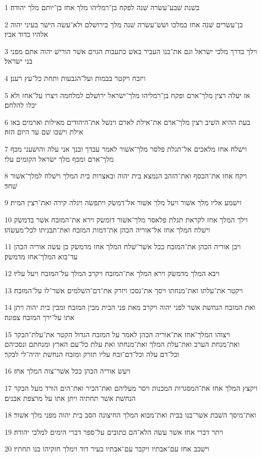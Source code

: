 \par 1 בשׁנת שׁבע־עשׂרה שׁנה לפקח בן־רמליהו מלך אחז בן־יותם מלך יהודה׃
\par 2 בן־עשׂרים שׁנה אחז במלכו ושׁשׁ־עשׂרה שׁנה מלך בירושׁלם ולא־עשׂה הישׁר בעיני יהוה אלהיו כדוד אביו׃
\par 3 וילך בדרך מלכי ישׂראל וגם את־בנו העביר באשׁ כתעבות הגוים אשׁר הורישׁ יהוה אתם מפני בני ישׂראל׃
\par 4 ויזבח ויקטר בבמות ועל־הגבעות ותחת כל־עץ רענן׃
\par 5 אז יעלה רצין מלך־ארם ופקח בן־רמליהו מלך־ישׂראל ירושׁלם למלחמה ויצרו על־אחז ולא יכלו להלחם׃
\par 6 בעת ההיא השׁיב רצין מלך־ארם את־אילת לארם וינשׁל את־היהודים מאילות וארמים באו אילת וישׁבו שׁם עד היום הזה׃
\par 7 וישׁלח אחז מלאכים אל־תגלת פלסר מלך־אשׁור לאמר עבדך ובנך אני עלה והושׁעני מכף מלך־ארם ומכף מלך ישׂראל הקומים עלי׃
\par 8 ויקח אחז את־הכסף ואת־הזהב הנמצא בית יהוה ובאצרות בית המלך וישׁלח למלך־אשׁור שׁחד׃
\par 9 וישׁמע אליו מלך אשׁור ויעל מלך אשׁור אל־דמשׂק ויתפשׂה ויגלה קירה ואת־רצין המית׃
\par 10 וילך המלך אחז לקראת תגלת פלאסר מלך־אשׁור דומשׂק וירא את־המזבח אשׁר בדמשׂק וישׁלח המלך אחז אל־אוריה הכהן את־דמות המזבח ואת־תבניתו לכל־מעשׂהו׃
\par 11 ויבן אוריה הכהן את־המזבח ככל אשׁר־שׁלח המלך אחז מדמשׂק כן עשׂה אוריה הכהן עד־בוא המלך־אחז מדמשׂק׃
\par 12 ויבא המלך מדמשׂק וירא המלך את־המזבח ויקרב המלך על־המזבח ויעל עליו׃
\par 13 ויקטר את־עלתו ואת־מנחתו ויסך את־נסכו ויזרק את־דם־השׁלמים אשׁר־לו על־המזבח׃
\par 14 ואת המזבח הנחשׁת אשׁר לפני יהוה ויקרב מאת פני הבית מבין המזבח ומבין בית יהוה ויתן אתו על־ירך המזבח צפונה׃
\par 15 ויצוהו המלך־אחז את־אוריה הכהן לאמר על המזבח הגדול הקטר את־עלת־הבקר ואת־מנחת הערב ואת־עלת המלך ואת־מנחתו ואת עלת כל־עם הארץ ומנחתם ונסכיהם וכל־דם עלה וכל־דם־זבח עליו תזרק ומזבח הנחשׁת יהיה־לי לבקר׃
\par 16 ויעשׂ אוריה הכהן ככל אשׁר־צוה המלך אחז׃
\par 17 ויקצץ המלך אחז את־המסגרות המכנות ויסר מעליהם ואת־הכיר ואת־הים הורד מעל הבקר הנחשׁת אשׁר תחתיה ויתן אתו על מרצפת אבנים׃
\par 18 ואת־מיסך השׁבת אשׁר־בנו בבית ואת־מבוא המלך החיצונה הסב בית יהוה מפני מלך אשׁור׃
\par 19 ויתר דברי אחז אשׁר עשׂה הלא־הם כתובים על־ספר דברי הימים למלכי יהודה׃
\par 20 וישׁכב אחז עם־אבתיו ויקבר עם־אבתיו בעיר דוד וימלך חזקיהו בנו תחתיו׃

